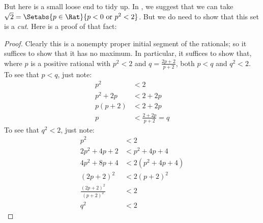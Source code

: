 But here is a small loose end to tidy up. In
, we suggest that we can take $\sqrt{2} =
\Setabs{p \in \Rat}{p < 0 \text{ or }p^2 < 2}$. But we do need to show
that this set is a \emph{cut}. Here is a proof of that fact:

\begin{proof}
Clearly this is a nonempty proper initial segment of the rationals; so
it suffices to show that it has no maximum. In particular, it suffices
to show that, where $p$ is a positive rational with $p^2 < 2$ and $q =
\frac{2p+2}{p+2}$, both $p < q$ and $q^2 < 2$. To see that $p < q$,
just note:
\begin{align*}
	p^2 &< 2\\
	p^2 + 2p &< 2 + 2p\\
	p(p + 2) &< 2 + 2p\\
	p &< \tfrac{2+2p}{p+2} = q
\end{align*}
To see that $q^2 < 2$, just note:
\begin{align*}
	p^2 &< 2\\
	2p^2 + 4p + 2 &< p^2 + 4p+ 4\\
	4p^2 + 8p + 4 &< 2(p^2 + 4p + 4)\\
	(2p+2)^2 & <2(p+2)^2\\
	\tfrac{(2p+2)^2}{(p+2)^2} &< 2\\
	q^2 &< 2
\end{align*}
\end{proof}
